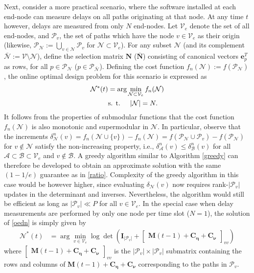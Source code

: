\documentclass[draftcls,onecolumn,12pt]{IEEEtran}
\providecommand{\abs}[1]{\lvert#1\rvert}												\renewcommand{\b}[1]{\ensuremath{\mathbf{#1}}}		 							\newcommand{\bs}[1]{\ensuremath{\boldsymbol{#1}}}		 						\renewcommand{\c}[1]{\ensuremath{\mathcal{#1}}} 								\newcommand{\E}[1]{\ensuremath{\mathbb{E}\left[#1\right]}} 		  \newcommand{\Es}[1]{\ensuremath{\mathbb{E}^{*}\left[#1\right]}} \newcommand{\ind}{1\hspace{-1.6mm}1}														\newcommand{\norm}[1]{\ensuremath{\left\|#1\right\|}}						\newcommand{\tb}[1]{\ensuremath{\tilde{\mathbf{#1}}}}		 				\newcommand{\mat}[1]{\ensuremath{\begin{bmatrix}#1\end{bmatrix}}}
\def \ceta {{\b{C}_{\bs{\eta}}}}
\def \cnu {{\b{C}_{\bs{\nu}}}}
\def \P {{\c{P}}}
\def \N {{\c{N}}}
\def \A {{\c{A}}}
\def \B {{\c{B}}}
\theoremstyle{plain}\newtheorem{thm}{Theorem}
\theoremstyle{definition}
\theoremstyle{remark}
\begin{document}
Next, consider a more practical scenario, where the software installed at each end-node can measure delays on all paths originating at that node.
At any time $t$ however, delays are measured from only $N$ end-nodes. 
Let $\c{V}_e$ denote the set of all end-nodes, and $\P_v$, the set of paths which have the node $v \in \c{V}_e$ as their origin (likewise, $\P_{\N}:= \bigcup_{v \in \N} \P_v$ for $\N \subset \c{V}_e$).
For any subset $\N$ (and its complement $\bar{\N} := \c{V} \setminus \N$), define the selection matrix $\b{N}$ ($\bar{\b{N}}$) consisting of canonical vectors $\b{e}^T_p$ as rows, for all $p \in \P_{\N}$ ($p \in \P_{\bar{\N}}$).
Defining the cost function $f_n(\N):=f(\P_{\N})$, the online optimal design problem for this scenario is expressed as
\begin{subequations}
\begin{align}
\N^{*}(t) &= \arg\min_{\N \subset \c{V}_e} f_n(\N) \label{oedn}\\
&\text{s. t.}\hspace{0.5cm} \abs{\N} = N.
\end{align}
\end{subequations}
It follows from the properties of submodular functions that the cost function $f_n(\N)$ is also monotonic and supermodular in $\N$.
In particular, observe that the increments $\delta_{\N}^n(v) = f_n(\N\cup\{v\})-f_n(\N) = f(\P_{\N} \cup \P_v) - f(\P_{\N})$ for $v \notin \N$ satisfy the non-increasing property, i.e., $\delta_{\A}^n(v) \leq \delta_{\B}^n(v)$  for all $\A\subset\B\subset\c{V}_e$ and $v \notin \B$.
A greedy algorithm similar to Algorithm \ref{greedy} can therefore be developed to obtain an approximate solution with the same $(1-1/e)$ guarantee as in \eqref{ratio}. 
Complexity of the greedy algorithm in this case would be however higher, since evaluating $\delta_{\N}(v)$ now requires rank-$\abs{\P_v}$ updates in the determinant and inverses. 
Nevertheless, the algorithm would still be efficient as long as $\abs{\P_v} \ll P$ for all $v \in \c{V}_e$.
In the special case when delay measurements are performed by only one node per time slot ($N=1$), the solution of \eqref{oedn} is simply given by
\begin{align}
\N^{*}(t) &= \arg\min_{v \in \c{V}_e} \log\det\left(\b{I}_{\abs{\P_v}} + \mat{\b{M}(t-1)+\ceta+\cnu}_{vv}\right)
\end{align}
where $\mat{\b{M}(t-1)+\ceta+\cnu}_{vv}$ is the $\abs{\P_v} \times \abs{\P_v}$ submatrix containing the rows and columns of $\b{M}(t-1)+\ceta+\cnu$ corresponding to the paths in $\P_v$. 
\end{document}
